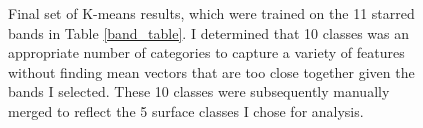 \documentclass[12pt]{article}
\begin{document}
\begin{figure}[h!]
    \centering
    \begin{center}
    \end{center}
    \caption{Final set of K-means results, which were trained on the 11 starred bands in Table \ref{band_table}. I determined that 10 classes was an appropriate number of categories to capture a variety of features without finding mean vectors that are too close together given the bands I selected. These 10 classes were subsequently manually merged to reflect the 5 surface classes I chose for analysis.}
    \label{km_results}
\end{figure}
\end{document}
